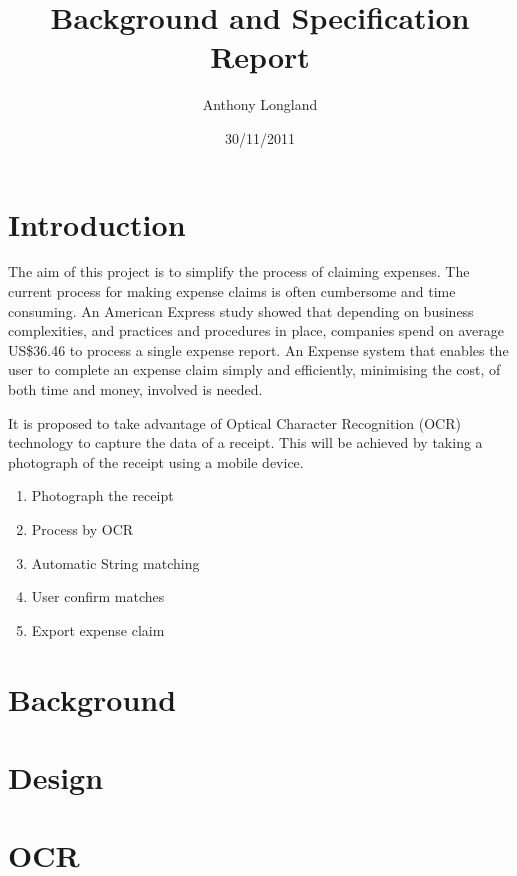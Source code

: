 \documentclass[a4paper]{article}
\begin{document}
\title{Background and Specification Report}
\author{Anthony Longland}
\date{30/11/2011} %
\maketitle

\tableofcontents


\section{Introduction}
The aim of this project is to simplify the process of claiming expenses. The current process for making expense claims is often cumbersome and time consuming. 
An American Express \cite{Expense2010} study showed that depending on business complexities, and practices and procedures in place, companies spend on average US\$36.46 to process a single expense report. An Expense system that enables the user to complete an expense claim simply and efficiently, minimising the cost, of both time and money, involved is needed.

It is proposed to take advantage of Optical Character Recognition (OCR) technology to capture the data of a receipt. This will be achieved by 
taking a photograph of the receipt using a mobile device. 
\begin{enumerate}
	\item Photograph the receipt
	\item Process by OCR
	\item Automatic String matching
	\item User confirm matches
	\item Export expense claim
\end{enumerate}



\section{Background}

\section{Design}

\section{OCR}
\end{document}
